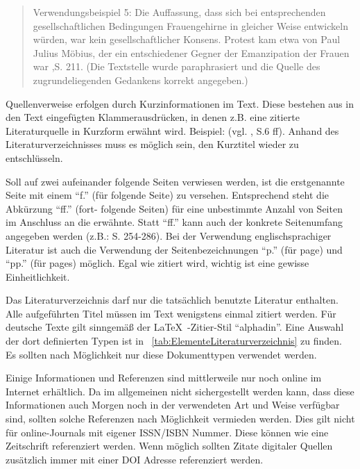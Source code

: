\begin{quote}
	Verwendungsbeispiel 5: Die Auffassung, dass sich bei entsprechenden gesellschaftlichen Bedingungen Frauengehirne in gleicher Weise entwickeln würden, war kein gesellschaftlicher Konsens. Protest kam etwa von Paul Julius Möbius, der ein entschiedener Gegner der Emanzipation der Frauen war \cite{Voss2011},S. 211. (Die Textstelle wurde paraphrasiert und die Quelle des zugrundeliegenden Gedankens korrekt angegeben.)
	
\end{quote}


Quellenverweise erfolgen durch Kurzinformationen im Text. Diese bestehen aus in den Text
eingefügten Klammerausdrücken, in denen z.B. eine zitierte Literaturquelle in Kurzform erwähnt
wird. Beispiel: (vgl. \cite{Schiller:Tell}, S.6 ff). Anhand des Literaturverzeichnisses muss es
möglich sein, den Kurztitel wieder zu entschlüsseln.

Soll auf zwei aufeinander folgende Seiten verwiesen werden, ist die erstgenannte Seite mit einem
"`f."' (für folgende Seite) zu versehen. Entsprechend steht die Abkürzung "`ff."' (fort- folgende
Seiten) für eine unbestimmte Anzahl von Seiten im Anschluss an die erwähnte. Statt "`ff."' kann
auch der konkrete Seitenumfang angegeben werden (z.B.: S. 254-286). Bei der Verwendung
englischsprachiger Literatur ist auch die Verwendung der Seitenbezeichnungen "`p."' (für page) und
"`pp."' (für pages) möglich. Egal wie zitiert wird, wichtig ist eine gewisse Einheitlichkeit.


Das Literaturverzeichnis darf nur die tatsächlich benutzte Literatur enthalten. Alle aufgeführten
Titel müssen im Text wenigstens einmal zitiert werden. Für deutsche Texte gilt sinngemäß der
\LaTeX\ -Zitier-Stil "`alphadin"'. Eine Auswahl der dort definierten Typen ist in
\tablename~\ref{tab:ElementeLiteraturverzeichnis} zu finden. Es sollten nach Möglichkeit nur diese
Dokumenttypen verwendet werden.

Einige Informationen und Referenzen sind mittlerweile nur noch online im Internet erhältlich. Da im
allgemeinen nicht sichergestellt werden kann, dass diese Informationen auch Morgen noch in der
verwendeten Art und Weise verfügbar sind, sollten solche Referenzen nach Möglichkeit vermieden
werden. Dies gilt nicht für online-Journals mit eigener ISSN/ISBN Nummer. Diese können wie eine Zeitschrift referenziert werden.
Wenn möglich sollten Zitate digitaler Quellen zusätzlich immer mit einer DOI Adresse referenziert werden.
\clearpage



